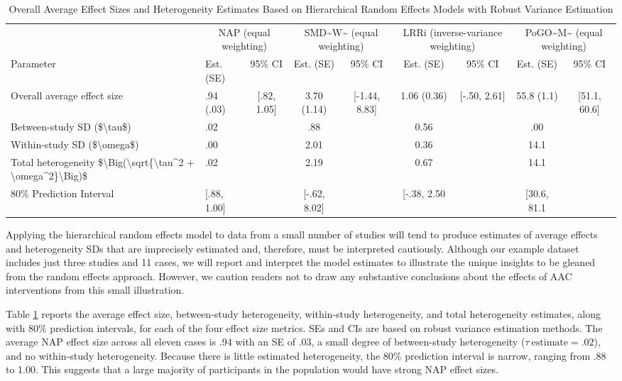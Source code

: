 \documentclass[
]{book}
\begin{document}
\begin{table}

\caption{\label{tab:RE-study-RVE}Overall Average Effect Sizes and Heterogeneity Estimates Based on Hierarchical Random Effects Models with Robust Variance Estimation}
\centering
\begin{tabular}[t]{l|l|c|c|c|c|c|c|c}
\hline
\multicolumn{1}{c|}{ } & \multicolumn{2}{c|}{NAP (equal weighting)} & \multicolumn{2}{c|}{SMD\textasciitilde{}W\textasciitilde{} (equal weighting)} & \multicolumn{2}{c|}{LRRi (inverse-variance weighting)} & \multicolumn{2}{c}{PoGO\textasciitilde{}M\textasciitilde{} (equal weighting)} \\
\cline{2-3} \cline{4-5} \cline{6-7} \cline{8-9}
Parameter & Est. (SE) & 95\% CI & Est. (SE) & 95\% CI & Est. (SE) & 95\% CI & Est. (SE) & 95\% CI\\
\hline
Overall average effect size & .94 (.03) & [.82, 1.05] & 3.70 (1.14) & [-1.44, 8.83] & 1.06 (0.36) & [-.50, 2.61] & 55.8 (1.1) & [51.1, 60.6]\\
\cline{1-9}
Between-study SD (\$\textbackslash{}tau\$) & .02 &  & .88 &  & 0.56 &  & .00 & \\
\cline{1-9}
Within-study SD (\$\textbackslash{}omega\$) & .00 &  & 2.01 &  & 0.36 &  & 14.1 & \\
\cline{1-9}
Total heterogeneity \$\textbackslash{}Big(\textbackslash{}sqrt\{\textbackslash{}tau\textasciicircum{}2 + \textbackslash{}omega\textasciicircum{}2\}\textbackslash{}Big)\$ & .02 &  & 2.19 &  & 0.67 &  & 14.1 & \\
\cline{1-9}
80\% Prediction Interval & [.88, 1.00] &  & [-.62, 8.02] &  & [-.38, 2.50 &  & [30.6, 81.1 & \\
\hline
\end{tabular}
\end{table}

Applying the hierarchical random effects model to data from a small number of studies will tend to produce estimates of average effects and heterogeneity SDs that are imprecisely estimated and, therefore, must be interpreted cautiously. Although our example dataset includes just three studies and 11 cases, we will report and interpret the model estimates to illustrate the unique insights to be gleaned from the random effects approach. However, we caution readers not to draw any substantive conclusions about the effects of AAC interventions from this small illustration.

Table \ref{tab:RE-study-RVE} reports the average effect size, between-study heterogeneity, within-study heterogeneity, and total heterogeneity estimates, along with 80\% prediction intervals, for each of the four effect size metrics. SEs and CIs are based on robust variance estimation methods. The average NAP effect size across all eleven cases is .94 with an SE of .03, a small degree of between-study heterogeneity (\(\tau \  \text{estimate} = .02\)), and no within-study heterogeneity. Because there is little estimated heterogeneity, the 80\% prediction interval is narrow, ranging from .88 to 1.00. This suggests that a large majority of participants in the population would have strong NAP effect sizes.
\end{document}
